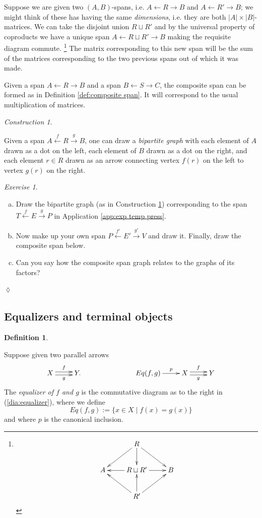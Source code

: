 \documentclass{book}
\def\to{\rightarrow}
\def\from{\leftarrow}
\def\|{{\;|\;}}
\newcommand{\To}[1]{\xrightarrow{#1}}
\newcommand{\From}[1]{\xleftarrow{#1}}
\theoremstyle{remark}
\newtheorem{construction}[subsubsection]{Construction}
\newtheorem{exc}[subsubsection]{Exercise}
\newenvironment{exercise}{\begin{exc}}{\hspace*{\fill}$\lozenge$\end{exc}}
\theoremstyle{definition}
\newtheorem{definition}[subsubsection]{Definition}
\def\sexc{\begin{enumerate}[a.)]\setlength{\itemsep}{.1cm}\setlength{\parskip}{.1cm}\item}
\def\next{\item}
\def\endsexc{\end{enumerate}}
\begin{document}
Suppose we are given two $(A,B)$-spans, i.e. $A\from R\to B$ and $A\from R'\to B$; we might think of these has having the same {\em dimensions}, i.e. they are both $|A|\times|B|$-matrices. We can take the disjoint union $R\sqcup R'$ and by the universal property of coproducts we have a unique span $A\from R\sqcup R'\to B$ making the requisite diagram commute.
\footnote{
$$\xymatrix{
&R\ar[dl]\ar[dr]\ar[d]\\
A&R\sqcup R'\ar[l]\ar[r]&B\\
&R'\ar[ur]\ar[ul]\ar[u]}
$$
}
The matrix corresponding to this new span will be the sum of the matrices corresponding to the two previous spans out of which it was made.

Given a span $A\from R\to B$ and a span $B\from S\to C$, the composite span can be formed as in Definition \ref{def:composite span}. It will correspond to the usual multiplication of matrices.

\begin{construction}\label{const:bipartite}

Given a span $A\From{f} R\To{g} B$, one can draw a {\em bipartite graph} with each element of $A$ drawn as a dot on the left, each element of $B$ drawn as a dot on the right, and each element $r\in R$ drawn as an arrow connecting vertex $f(r)$ on the left to vertex $g(r)$ on the right.

\end{construction}

\begin{exercise}~
\sexc Draw the bipartite graph (as in Construction \ref{const:bipartite}) corresponding to the span $T\From{f}E\To{g}P$ in Application \ref{app:exp temp press}.
\next Now make up your own span $P\From{f'}E'\To{g'}V$ and draw it. Finally, draw the composite span below. 
\next Can you say how the composite span graph relates to the graphs of its factors?
\endsexc
\end{exercise}


\subsection{Equalizers and terminal objects}

\begin{definition}\label{def:equalizer}

Suppose given two parallel arrows 
\begin{align}\label{dia:equalizer}
\xymatrix{X\ar@<.5ex>[r]^f\ar@<-.5ex>[r]_g&Y.}\hspace{1in}\xymatrix{Eq(f,g)\ar[r]^-p&X\ar@<.5ex>[r]^f\ar@<-.5ex>[r]_g&Y}
\end{align}
The {\em equalizer of $f$ and $g$} is the commutative diagram as to the right in (\ref{dia:equalizer}), where we define $$Eq(f,g):=\{x\in X\|f(x)=g(x)\}$$ and where $p$ is the canonical inclusion.

\end{definition}
\end{document}

